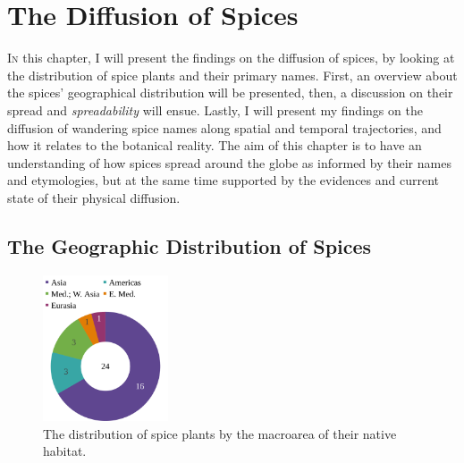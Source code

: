 \chapter{The Diffusion of Spices}
\label{ch:diffusion}




\lettrine[lines=\iniciale]{\textcolor{\accentcolor}{I}}{n} this chapter, I will present the findings on the diffusion of spices, by looking at the distribution of spice plants and their primary names. First, an overview about the spices' geographical distribution will be presented, then, a discussion on their spread and \textit{spreadability} will ensue. Lastly, I will present my findings on the diffusion of wandering spice names along spatial and temporal trajectories, and how it relates to the botanical reality. The aim of this chapter is to have an understanding of how spices spread around the globe as informed by their names and etymologies, but at the same time supported by the evidences and current state of their physical diffusion.

\section{The Geographic Distribution of Spices}

\begin{figure}
    \vspace{-\baselineskip}
    \includegraphics[width=0.33\textwidth]{imgs/plots/macroarea_pie.pdf}
    \caption{The distribution of spice plants by the macroarea of their native habitat.}
    \label{fig:macroarea_pie}
  \end{figure}
  

